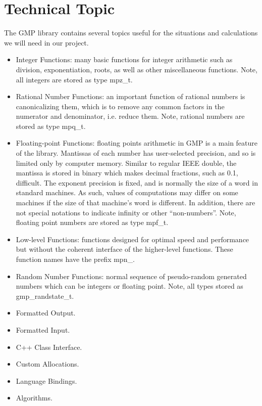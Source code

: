 \section{Technical Topic}
\dd \bigskip


The GMP library contains several topics useful for the
situations and calculations we will need in our project.

\begin{itemize}

\item Integer Functions: many basic functions for integer
  arithmetic such as division, exponentiation, roots, as
  well as other miscellaneous functions. Note, all integers
  are stored as type mpz\_t.

\item Rational Number Functions: an important function of
  rational numbers is canonicalizing them, which is to
  remove any common factors in the numerator and
  denominator, i.e. reduce them. Note, rational numbers are
  stored as type mpq\_t.

\item Floating-point Functions: floating points arithmetic
  in GMP is a main feature of the library. Mantissas of each
  number has user-selected precision, and so is limited only
  by computer memory. Similar to regular IEEE double, the
  mantissa is stored in binary which makes decimal
  fractions, such as 0.1, difficult. The exponent precision
  is fixed, and is normally the size of a word in standard
  machines. As such, values of computations may differ on
  some machines if the size of that machine's word is
  different. In addition, there are not special
  notations to indicate infinity or other ``non-numbers''.
  Note, floating point numbers are stored as type mpf\_t.

\item Low-level Functions: functions designed for optimal
  speed and performance but without the coherent interface
  of the higher-level functions.
  These function names have the prefix mpn\_.

\item Random Number Functions: normal sequence of
  pseudo-random generated numbers which can be integers or
  floating point. Note, all types stored as
  gmp\_randstate\_t.

\item Formatted Output.
\item Formatted Input.
\item C++ Class Interface.
\item Custom Allocations.
\item Language Bindings.
\item Algorithms.

\end{itemize}

